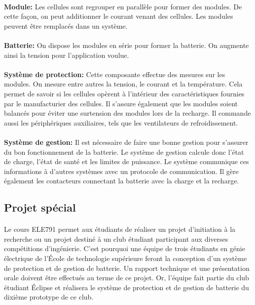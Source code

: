 		\paragraph{}   \textbf{Module:}
		 Les cellules sont regrouper en parallèle pour former des modules. De cette façon, on peut additionner le courant venant des cellules. Les modules peuvent être remplacés dans un système.
		
		\paragraph{}   \textbf{Batterie:}
		 On dispose les modules en série pour former la batterie. On augmente ainsi la tension pour l'application voulue.
		
		\paragraph{}   \textbf{Système de protection:}
		 Cette composante effectue des mesures sur les modules. On mesure entre autres la tension, le courant et la température. Cela permet de savoir si les cellules opèrent à l'intérieur des caractéristiques fournies par le manufacturier des cellules. Il s'assure également que les modules soient balancés pour éviter une surtension des modules lors de la recharge. Il commande aussi les périphériques auxiliaires, tels que les ventilateurs de refroidissement.
		
		\paragraph{}   \textbf{Système de gestion:}
		 Il est nécessaire de faire une bonne gestion pour s'assurer du bon fonctionnement de la batterie. Le système de gestion calcule donc l'état de charge, l'état de santé et les limites de puissance. Le système communique ces informations à d'autres systèmes avec un protocole de communication. Il gère également les contacteurs connectant la batterie avec la charge et la recharge.
	
	\subsection{Projet spécial}

		\paragraph{}
		Le cours ELE791 permet aux étudiants de réaliser un projet d'initiation à la recherche ou un projet destiné à un club étudiant participant aux diverses compétitions d'ingénierie. C'est pourquoi une équipe de trois étudiants en génie électrique de l'École de technologie supérieure feront la conception d'un système de protection et de gestion de batterie. Un rapport technique et une présentation orale doivent être effectués au terme de ce projet. Or, l'équipe fait partie du club étudiant Éclipse et réalisera le système de protection et de gestion de batterie du dixième prototype de ce club.
	
